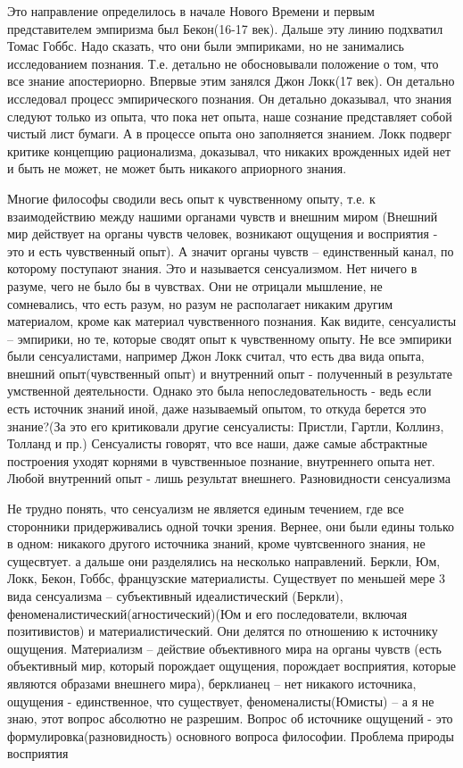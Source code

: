 Это направление определилось в начале Нового Времени и первым представителем эмпиризма был Бекон(16-17 век). Дальше эту линию подхватил Томас Гоббс. Надо сказать, что они были эмпириками, но не занимались исследованием познания. Т.е. детально не обосновывали положение о том, что все знание апостериорно. Впервые этим занялся Джон Локк(17 век). Он детально исследовал процесс эмпирического познания. Он детально доказывал, что знания следуют только из опыта, что пока нет опыта, наше сознание представляет собой чистый лист бумаги. А в процессе опыта оно заполняется знанием. Локк подверг критике концепцию рационализма, доказывал, что никаких врожденных идей нет и быть не может, не может быть никакого априорного знания.

Многие философы сводили весь опыт к чувственному опыту, т.е. к взаимодействию между нашими органами чувств и внешним миром (Внешний мир действует на органы чувств человек, возникают ощущения и восприятия - это и есть чувственный опыт). А значит органы чувств – единственный канал, по которому поступают знания. Это и называется сенсуализмом. Нет ничего в разуме, чего не было бы в чувствах. Они не отрицали мышление, не сомневались, что есть разум, но разум не располагает никаким другим материалом, кроме как материал чувственного познания. Как видите, сенсуалисты – эмпирики, но те, которые сводят опыт к чувственному опыту. Не все эмпирики были сенсуалистами, например Джон Локк считал, что есть два вида опыта, внешний опыт(чувственный опыт) и внутренний опыт - полученный в результате умственной деятельности. Однако это была непоследовательность - ведь если есть источник знаний иной, даже называемый опытом, то откуда берется это знание?(За это его критиковали другие сенсуалисты: Пристли, Гартли, Коллинз, Толланд и пр.) Сенсуалисты говорят, что все наши, даже самые абстрактные построения уходят корнями в чувственныое познание, внутреннего опыта нет. Любой внутренний опыт - лишь результат внешнего.
Разновидности сенсуализма

Не трудно понять, что сенсуализм не является единым течением, где все сторонники придерживались одной точки зрения. Вернее, они были едины только в одном: никакого другого источника знаний, кроме чувтсвенного знания, не сущесвтует. а дальше они разделялись на несколько направлений. Беркли, Юм, Локк, Бекон, Гоббс, французские материалисты. Существует по меньшей мере 3 вида сенсуализма – субъективный идеалистический (Беркли), феноменалистический(агностический)(Юм и его последователи, включая позитивистов) и материалистический. Они делятся по отношению к источнику ощущения. Материализм – действие объективного мира на органы чувств (есть объективный мир, который порождает ощущения, порождает восприятия, которые являются образами внешнего мира), берклианец – нет никакого источника, ощущения - единственное, что существует, феноменалисты(Юмисты) – а я не знаю, этот вопрос абсолютно не разрешим. Вопрос об источнике ощущений - это формулировка(разновидность) основного вопроса философии.
Проблема природы восприятия

